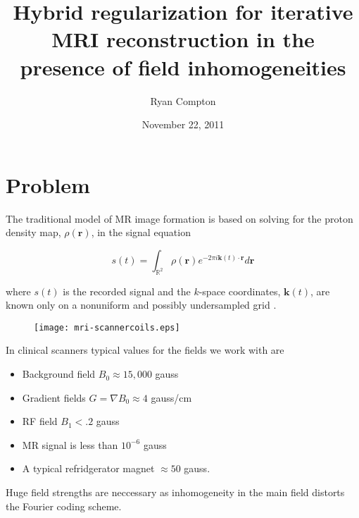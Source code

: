 \documentclass[xcolor=dvipsnames]{beamer}
\title{Hybrid regularization for iterative MRI reconstruction in the presence of field inhomogeneities}
\author{Ryan Compton}
\date{November 22, 2011}
\newcommand*{\sectionpage}{\usebeamertemplate*{section page}}
\theoremstyle{remark}
\begin{document}
\begin{frame}
\titlepage
\end{frame}

\section{Problem}
\frame{\sectionpage}

\begin{frame}
The traditional model of MR image formation is based on solving for the proton density map, $\rho(\mathbf{r})$, in the signal equation

\begin{equation}\label{sigeq}
s(t) = \int_{\mathbb{R}^2} \rho(\mathbf{r})e^{-2\pi i \mathbf{k}(t) \cdot \mathbf{r}} d\mathbf{r}
\end{equation}

where $s(t)$ is the recorded signal and the $k$-space coordinates, $\mathbf{k}(t)$, are known only on a nonuniform and possibly undersampled grid \cite{Haacke1999}.
\end{frame}

\begin{frame}

\begin{center}
\begin{figure}
\texttt{[image: mri-scannercoils.eps]}
\end{figure}
\end{center}

\end{frame}


\begin{frame}

In clinical scanners typical values for the fields we work with are
\begin{itemize}
\item Background field $B_0 \approx 15,000$ gauss
\item Gradient fields $G = \nabla B_0  \approx 4$ gauss/cm
\item RF field $B_1 < .2$ gauss
\item MR signal is less than $10^{-6}$ gauss
\pause
\item A typical refridgerator magnet $\approx 50$ gauss.
\end{itemize}

\end{frame}

\begin{frame}

Huge field strengths are neccessary as inhomogeneity in the main field distorts the Fourier coding scheme.

\end{frame}
\end{document}
